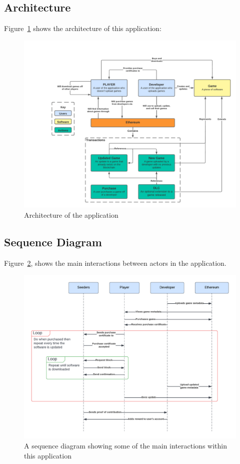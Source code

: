 \subsection*{Architecture}

Figure~\ref{fig:architecture-diagram} shows the architecture of this application:

\begin{figure}[ht]
  \centering
  \includegraphics*[width=\textwidth]{assets/images/diagrams/architecture-diagram.png}
  \caption{Architecture of the application}
  \label{fig:architecture-diagram}
\end{figure}

\subsection*{Sequence Diagram}

Figure~\ref{fig:sequence-diagram}, shows the main interactions between actors in the application.

\begin{figure}[ht]
  \centering
  \includegraphics[width=.95\textwidth]{assets/images/diagrams/seqeunce-diagram.png}
  \caption{A sequence diagram showing some of the main interactions within this application}
  \label{fig:sequence-diagram}
\end{figure}
